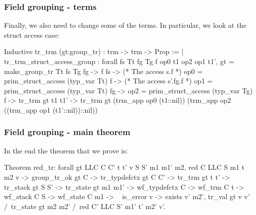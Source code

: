\begin{frame}[fragile]
\frametitle{Field grouping - terms}

Finally, we also need to change some of the terms. In particular, we look at the struct access case:

\begin{coqs}
Inductive tr_trm (gt:group_tr) : trm -> trm -> Prop :=
  | tr_trm_struct_access_group : forall fs Tt fg Tg f op0 t1 op2 op1 t1',
      gt = make_group_tr Tt fs Tg fg ->
      f \in fs ->
      (* The access s.f *)
      op0 = prim_struct_access (typ_var Tt) f ->
      (* The access s'.fg.f *)
      op1 = prim_struct_access (typ_var Tt) fg ->
      op2 = prim_struct_access (typ_var Tg) f ->
      tr_trm gt t1 t1' ->
      tr_trm gt (trm_app op0 (t1::nil)) (trm_app op2 ((trm_app op1 (t1'::nil))::nil))
\end{coqs}

\end{frame}


\begin{frame}[fragile]
\frametitle{Field grouping - main theorem}

In the end the theorem that we prove is:

\begin{coq}
Theorem red_tr: forall gt LLC C C' t t' v S S' m1 m1' m2,
  red C LLC S m1 t m2 v ->
  group_tr_ok gt C ->
  tr_typdefctx gt C C' ->
  tr_trm gt t t' ->
  tr_stack gt S S' ->
  tr_state gt m1 m1' ->
  wf_typdefctx C ->
  wf_trm C t ->
  wf_stack C S ->
  wf_state C m1 ->
  ~ is_error v ->
  exists v' m2',				tr_val gt v v'
			/\	tr_state gt m2 m2'
			/\	red C' LLC S' m1' t' m2' v'.
\end{coq}

\end{frame}


